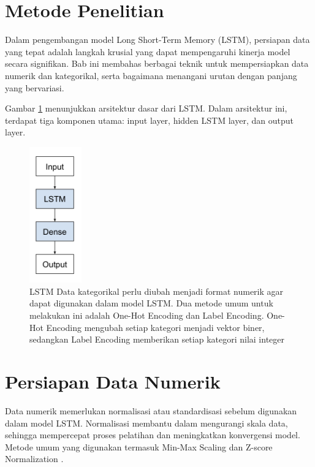 \section{Metode Penelitian}
\par Dalam pengembangan model Long Short-Term Memory (LSTM), persiapan data yang tepat adalah langkah krusial yang dapat mempengaruhi kinerja model secara signifikan. Bab ini membahas berbagai teknik untuk mempersiapkan data numerik dan kategorikal, serta bagaimana menangani urutan dengan panjang yang bervariasi.
\par Gambar \ref{fig:lstm_architecture} menunjukkan arsitektur dasar dari LSTM. Dalam arsitektur ini, terdapat tiga komponen utama: input layer, hidden LSTM layer, dan output layer.

\begin{figure}[h]
    \centering
    \includegraphics[width=0.2\textwidth]{image/lstm1.png} 
    \caption{ LSTM Data kategorikal perlu diubah menjadi format numerik agar dapat digunakan dalam model LSTM. Dua metode umum untuk melakukan ini adalah One-Hot Encoding dan Label Encoding. One-Hot Encoding mengubah setiap kategori menjadi vektor biner, sedangkan Label Encoding memberikan setiap kategori nilai integer \parencite{brownlee2017}}
    \label{fig:lstm_architecture}
\end{figure}
\section{Persiapan Data Numerik}
\par Data numerik memerlukan normalisasi atau standardisasi sebelum digunakan dalam model LSTM. Normalisasi membantu dalam mengurangi skala data, sehingga mempercepat proses pelatihan dan meningkatkan konvergensi model. Metode umum yang digunakan termasuk Min-Max Scaling dan Z-score Normalization \parencite{brownlee2017}.

